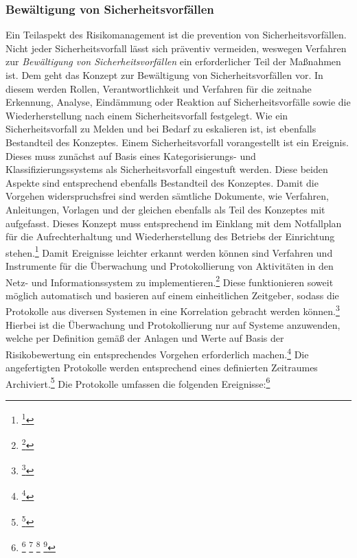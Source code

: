 \documentclass[11pt,a4paper,hidelinks]{article}   %
\begin{document}
            \subsubsection{Bewältigung von Sicherheitsvorfällen}
            Ein Teilaspekt des Risikomanagement ist die prevention von Sicherheitsvorfällen. Nicht jeder Sicherheitsvorfall lässt sich präventiv vermeiden, weswegen Verfahren zur \emph{Bewältigung von Sicherheitsvorfällen} ein erforderlicher Teil der Maßnahmen ist. Dem geht  das Konzept zur Bewältigung von Sicherheitsvorfällen vor. In diesem werden Rollen, Verantwortlichkeit und Verfahren für die zeitnahe Erkennung, Analyse, Eindämmung oder Reaktion auf Sicherheitsvorfälle sowie die Wiederherstellung nach einem Sicherheitsvorfall festgelegt. Wie ein Sicherheitsvorfall zu Melden und bei Bedarf zu eskalieren ist, ist ebenfalls Bestandteil des Konzeptes. Einem Sicherheitsvorfall vorangestellt ist ein Ereignis. Dieses muss zunächst auf Basis eines Kategorisierungs- und Klassifizierungssystems als Sicherheitsvorfall eingestuft werden. Diese beiden Aspekte sind entsprechend ebenfalls Bestandteil des Konzeptes. Damit die Vorgehen widerspruchsfrei sind werden sämtliche Dokumente, wie Verfahren, Anleitungen, Vorlagen und der gleichen ebenfalls als Teil des Konzeptes mit aufgefasst. Dieses Konzept muss entsprechend im Einklang mit dem Notfallplan für die Aufrechterhaltung und Wiederherstellung des Betriebs der Einrichtung stehen.\footnote{\footcite[Vgl.][, Anhang, Nummer 3.1.1. \& 3.1.2.]{EU2024-2690}} Damit Ereignisse leichter erkannt werden können sind Verfahren und Instrumente für die Überwachung und Protokollierung von Aktivitäten in den Netz- und Informationssystem zu implementieren.\footnote{\footcite[Vgl.][, Anhang, Nummer 3.2.1.]{EU2024-2690}} Diese funktionieren soweit möglich automatisch und basieren auf einem einheitlichen Zeitgeber, sodass die Protokolle aus diversen Systemen in eine Korrelation gebracht werden können.\footnote{\footcite[Vgl.][, Anhang, Nummer 3.2.2. \& 3.2.6.]{EU2024-2690}} Hierbei ist die Überwachung und Protokollierung nur auf Systeme anzuwenden, welche per Definition gemäß der Anlagen und Werte auf Basis der Risikobewertung ein entsprechendes Vorgehen erforderlich machen.\footnote{\footcite[Vgl.][, Anhang, Nummer 3.2.6.]{EU2024-2690}} Die angefertigten Protokolle werden entsprechend eines definierten Zeitraumes Archiviert.\footnote{\footcite[Vgl.][, Anhang, Nummer 3.2.5.]{EU2024-2690}} Die Protokolle umfassen die folgenden Ereignisse:\footnote{
                \footcite[Vgl.][, Anhang, Nummer 3.2.3.]{EU2024-2690}
                \footcite[Vgl.][, Artikel 21, Absatz 1]{EU2022-2555}
                \footcite[Vgl.][, §30 Absatz 2, Nummer 2]{NIS2UmsuCG} %
                \footcite[Vgl.][, S. 44]{nist-sp800-39}
            }
\end{document}
